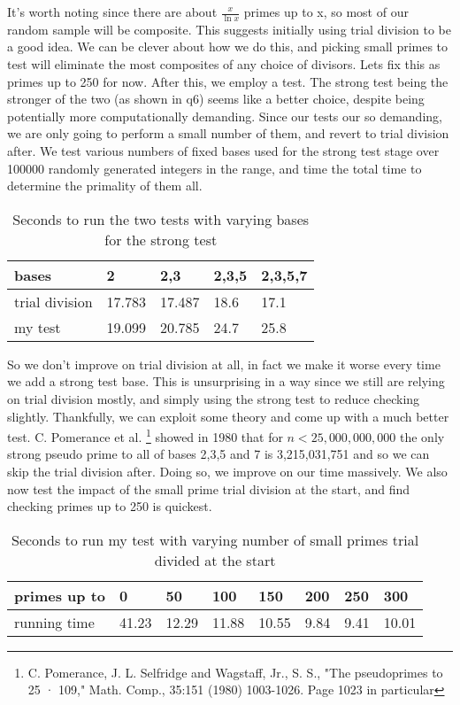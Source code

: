 \documentclass[10pt,a4paper]{report}
\begin{document}
It's worth noting since there are about $\frac{x}{\ln{x}}$ primes up to x, so most of our random sample will be composite. This suggests initially using trial division to be a good idea. We can be clever about how we do this, and picking small primes to test will eliminate the most composites of any choice of divisors. Lets fix this as primes up to 250 for now. After this, we employ a test. The strong test being the stronger of the two (as shown in q6) seems like a better choice, despite being potentially more computationally demanding. Since our tests our so demanding, we are only going to perform a small number of them, and revert to trial division after. We test various numbers of fixed bases used for the strong test stage over 100000 randomly generated integers in the range, and time the total time to determine the primality of them all.\\

\begin{table}[]
\centering
\begin{tabular}{|l|l|l|l|l|}
\hline
    bases           & 2      & 2,3    & 2,3,5 & 2,3,5,7 \\ \hline
trial division & 17.783 & 17.487 & 18.6  & 17.1    \\ \hline
my test        & 19.099 & 20.785 & 24.7  & 25.8    \\ \hline
\end{tabular}
\caption{Seconds to run the two tests with varying bases for the strong test}
\end{table}


So we don't improve on trial division at all, in fact we make it worse every time we add a strong test base. This is unsurprising in a way since we still are relying on trial division mostly, and simply using the strong test to reduce checking slightly. Thankfully, we can exploit some theory and come up with a much better test. C. Pomerance et al. \footnote{C. Pomerance, J. L. Selfridge and Wagstaff, Jr., S. S., "The pseudoprimes to 25 · 109," Math. Comp., 35:151 (1980) 1003-1026. Page 1023 in particular} showed  in 1980 that for $n < 25,000,000,000$ the only strong pseudo prime to all of bases 2,3,5 and 7 is  3,215,031,751 and so we can skip the trial division after. Doing so, we improve on our time massively. We also now test the impact of the small prime trial division at the start, and find checking primes up to 250 is quickest.\\

\begin{table}[h]
\centering
\begin{tabular}{|l|l|l|l|l|l|l|l|}
\hline
primes up to & 0     & 50    & 100   & 150   & 200  & 250  & 300   \\ \hline
running time & 41.23 & 12.29 & 11.88 & 10.55 & 9.84 & 9.41 & 10.01 \\ \hline
\end{tabular}
\caption{Seconds to run my test with varying number of small primes trial divided at the start}
\end{table}
\end{document}
